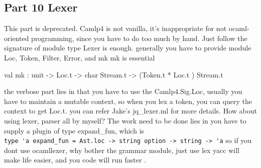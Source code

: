 \subsection{Part 10 Lexer }

  This part is deprecated. Camlp4 is not vanilla, it's inappropriate
  for not ocaml-oriented programming, since you have to do too much by
  hand.  Just follow the signature of module type Lexer is enough.
  generally you have to provide module Loc, Token, Filter, Error, and
  mk mk is essential

  \begin{ocamlcode}
val mk : unit -> Loc.t -> char Stream.t -> (Token.t * Loc.t ) Stream.t     
  \end{ocamlcode}

  the verbose part lies in that you have to use the Camlp4.Sig.Loc,
  usually you have to maintain a mutable context, so when you lex a
  token, you can query the context to get Loc.t. you can refer Jake's jq\_lexer.ml
  for more details. How about using lexer, parser all by myself?
  The work need to be done lies in you have to supply a plugin of type
  expand\_fun, which is \\
  \verb|type 'a expand_fun = Ast.loc -> string option -> string -> 'a|
  so if you dont use ocamllexer, why bother the grammar module, just
  use lex yacc will make life easier, and you code will run faster . 

